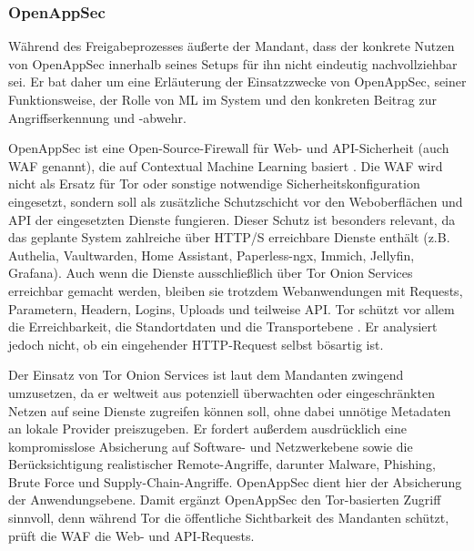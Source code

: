 
\subsubsection{OpenAppSec}
Während des Freigabeprozesses äußerte der Mandant, dass der konkrete Nutzen von OpenAppSec innerhalb seines Setups für ihn nicht eindeutig nachvollziehbar sei. Er bat daher um eine Erläuterung der Einsatzzwecke von OpenAppSec, seiner Funktionsweise, der Rolle von \ac{ML} im System und den konkreten Beitrag zur Angriffserkennung und -abwehr.

OpenAppSec ist eine Open-Source-Firewall für Web- und \ac{API}-Sicherheit (auch \ac{WAF} genannt), die auf Contextual Machine Learning basiert \cite{openappsec_tech}. Die \acs{WAF} wird nicht als Ersatz für Tor oder sonstige notwendige Sicherheitskonfiguration eingesetzt, sondern soll als zusätzliche Schutzschicht vor den Weboberflächen und \acs{API} der eingesetzten Dienste fungieren. Dieser Schutz ist besonders relevant, da das geplante System zahlreiche über \acs{HTTP}/S erreichbare Dienste enthält (z.B.  Authelia, Vaultwarden, Home Assistant, Paperless-ngx, Immich, Jellyfin, Grafana). Auch wenn die Dienste ausschließlich über Tor Onion Services erreichbar gemacht werden, bleiben sie trotzdem Webanwendungen mit Requests, Parametern, Headern, Logins, Uploads und teilweise \acs{API}. Tor schützt vor allem die Erreichbarkeit, die Standortdaten und die Transportebene \cite{tor_onion_services}. Er analysiert jedoch nicht, ob ein eingehender \acs{HTTP}-Request selbst bösartig ist.

Der Einsatz von Tor Onion Services ist laut dem Mandanten zwingend umzusetzen, da er weltweit aus potenziell überwachten oder eingeschränkten Netzen auf seine Dienste zugreifen können soll, ohne dabei unnötige Metadaten an lokale Provider preiszugeben. Er fordert außerdem ausdrücklich eine kompromisslose Absicherung auf Software- und Netzwerkebene sowie die Berücksichtigung realistischer Remote-Angriffe, darunter Malware, Phishing, Brute Force und Supply-Chain-Angriffe. OpenAppSec dient hier der Absicherung der Anwendungsebene. Damit ergänzt OpenAppSec den Tor-basierten Zugriff sinnvoll, denn während Tor die öffentliche Sichtbarkeit des Mandanten schützt, prüft die \acl{WAF} die Web- und \ac{API}-Requests. \cite{tor_onion_services, owasp_waf}

